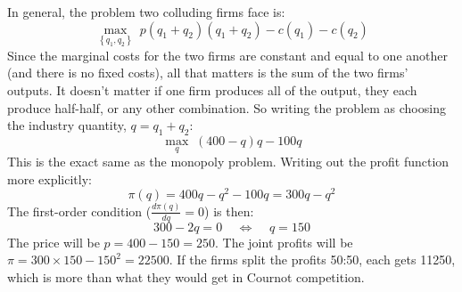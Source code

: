 \documentclass[12pt]{article}
\newcounter{question}[section]
\newenvironment{subquestions}{
  \begin{enumerate}[label=(\roman*)]}{\end{enumerate}}
\begin{document}
\begin{subquestions}
    \textcolor{solution-color}{
      In general, the problem two colluding firms face is:
      \[
        \underset{\left\{ q_1,q_2 \right\}}{\max}\; p\left( q_1+q_2
        \right)\left( q_1+q_2 \right)- c\left( q_1 \right)-c\left( q_2
      \right)
      \]
      Since the marginal costs for the two firms are constant and equal to one
      another (and there is no fixed costs), all that matters is the sum of the
      two firms' outputs. It doesn't matter if one firm
      produces all of the output, they each produce half-half, or any other
      combination. So writing the problem as choosing the industry quantity,
      $q=q_1+q_2$:
      \[
        \underset{q}{\max}\; \left( 400-q \right)q- 100q
      \]
      This is the exact same as the monopoly problem. Writing out the profit
      function more explicitly:
      \[
        \pi\left( q \right)=400q - q^2 - 100q = 300q - q^2
      \]
      The first-order condition ($\frac{d\pi\left( q \right)}{dq}=0$) is then:
      \[
        300-2q=0 \;\;\;\;\Longleftrightarrow \;\;\;\;q = 150
      \]
      The price will be $p=400-150=250$. The joint profits will be
      $\pi=300\times 150 - 150^2 = 22500$.
      If the firms split the profits 50:50, each gets 11250, which is more than
      what they would get in Cournot competition.
    }
\end{subquestions}
\end{document}
